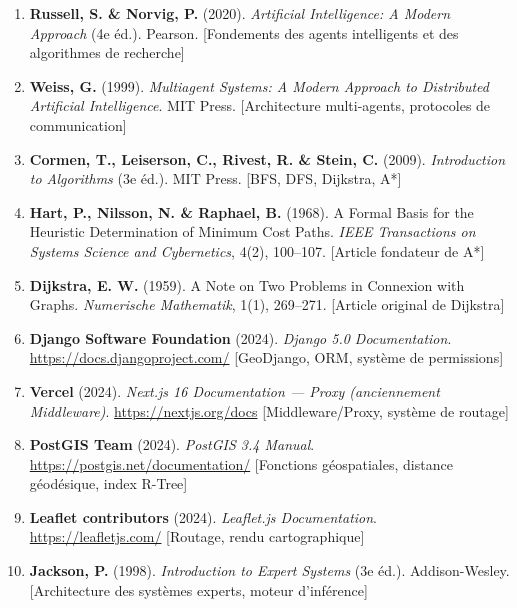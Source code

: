 \documentclass[12pt, a4paper]{report}
\theoremstyle{definition}
\begin{document}
\begin{enumerate}
\item \textbf{Russell, S. \& Norvig, P.} (2020). \textit{Artificial Intelligence: A Modern Approach} (4e éd.). Pearson. [Fondements des agents intelligents et des algorithmes de recherche]

\item \textbf{Weiss, G.} (1999). \textit{Multiagent Systems: A Modern Approach to Distributed Artificial Intelligence}. MIT Press. [Architecture multi-agents, protocoles de communication]

\item \textbf{Cormen, T., Leiserson, C., Rivest, R. \& Stein, C.} (2009). \textit{Introduction to Algorithms} (3e éd.). MIT Press. [BFS, DFS, Dijkstra, A*]

\item \textbf{Hart, P., Nilsson, N. \& Raphael, B.} (1968). A Formal Basis for the Heuristic Determination of Minimum Cost Paths. \textit{IEEE Transactions on Systems Science and Cybernetics}, 4(2), 100--107. [Article fondateur de A*]

\item \textbf{Dijkstra, E. W.} (1959). A Note on Two Problems in Connexion with Graphs. \textit{Numerische Mathematik}, 1(1), 269--271. [Article original de Dijkstra]

\item \textbf{Django Software Foundation} (2024). \textit{Django 5.0 Documentation}. \url{https://docs.djangoproject.com/} [GeoDjango, ORM, système de permissions]

\item \textbf{Vercel} (2024). \textit{Next.js 16 Documentation — Proxy (anciennement Middleware)}. \url{https://nextjs.org/docs} [Middleware/Proxy, système de routage]

\item \textbf{PostGIS Team} (2024). \textit{PostGIS 3.4 Manual}. \url{https://postgis.net/documentation/} [Fonctions géospatiales, distance géodésique, index R-Tree]

\item \textbf{Leaflet contributors} (2024). \textit{Leaflet.js Documentation}. \url{https://leafletjs.com/} [Routage, rendu cartographique]

\item \textbf{Jackson, P.} (1998). \textit{Introduction to Expert Systems} (3e éd.). Addison-Wesley. [Architecture des systèmes experts, moteur d'inférence]
\end{enumerate}
\end{document}
